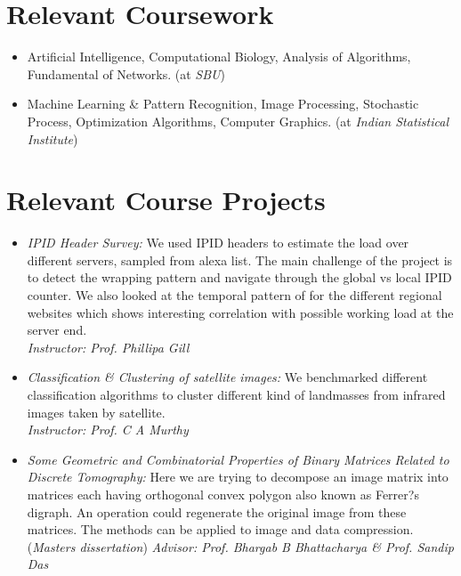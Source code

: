 \documentclass{res}
\begin{document}
\begin{resume}
\section{Relevant Coursework} 
\begin{itemize}
\item Artificial Intelligence,  Computational Biology, Analysis of Algorithms, Fundamental of Networks. (at {\it SBU})
\item Machine Learning \& Pattern Recognition, Image Processing, Stochastic Process, Optimization Algorithms, Computer Graphics. (at {\it
Indian Statistical Institute})
\end{itemize}



\section{Relevant Course Projects}
\begin{itemize}
 \item{ \it{IPID Header Survey:}} We used IPID headers to estimate the load over different servers, sampled from alexa
 list. The main challenge of the project is to detect the wrapping pattern and navigate through the global vs local IPID counter. 
 We also looked at the temporal pattern of for the different regional websites which shows interesting correlation with possible 
 working load at the server end. \\
 {\it Instructor: Prof. Phillipa Gill}
 
 
 \item {{\it Classification \& Clustering of satellite images:}} We benchmarked different classification algorithms to cluster different 
 kind of landmasses from infrared images taken by satellite. \\
 {\it Instructor: Prof. C A Murthy}
  
 \item {{\it Some Geometric and Combinatorial Properties of Binary Matrices Related to
Discrete Tomography:}} Here we are trying to decompose an image matrix into matrices
each having orthogonal convex polygon also known as Ferrer?s digraph. An operation could
regenerate the original image from these matrices. The methods can be applied to image and
data compression. ({\it Masters dissertation}) 
{\it Advisor: Prof. Bhargab B Bhattacharya \& Prof. Sandip Das}


\end{itemize}
\end{resume}
\end{document}
